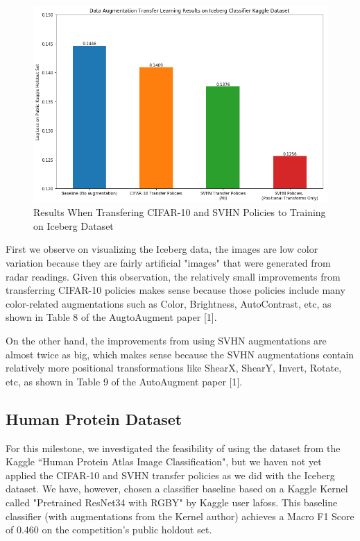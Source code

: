 \documentclass[10pt,twocolumn,letterpaper]{article}
\begin{document}
\begin{figure}[bhp]
\includegraphics[width=\columnwidth]{iceberg_results.png}
\caption{Results When Transfering CIFAR-10 and SVHN Policies to Training on Iceberg Dataset}
\end{figure}

First we observe on visualizing the Iceberg data, the images are low color variation because they are fairly artificial "images" that were generated from radar readings. Given this observation, the relatively small improvements from transferring CIFAR-10 policies makes sense because those policies include many color-related augmentations such as Color, Brightness, AutoContrast, etc, as shown in Table 8 of the AugtoAugment paper [1].  

On the other hand, the improvements from using SVHN augmentations are almost twice as big, which makes sense because the SVHN augmentations contain relatively more positional transformations like ShearX, ShearY, Invert, Rotate, etc, as shown in Table 9 of the AutoAugment paper [1].  



\subsection{Human Protein Dataset}

For this milestone, we investigated the feasibility of using the dataset from the Kaggle “Human Protein Atlas Image Classification", but we haven not yet applied the CIFAR-10 and SVHN transfer policies as we did with the Iceberg dataset.  We have, however, chosen a classifier baseline based on a Kaggle Kernel called "Pretrained ResNet34 with RGBY" by Kaggle user lafoss.  This baseline classifier (with augmentations from the Kernel author) achieves a Macro F1 Score of 0.460 on the competition's public holdout set.  
\end{document}
